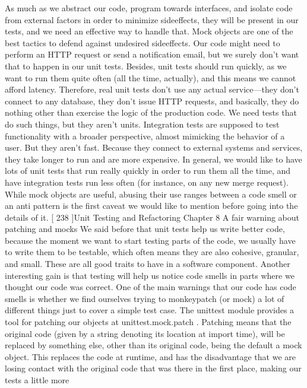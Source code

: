 \documentclass[a4paper,10pt,english]{sphinxmanual}
\begin{document}
As much as we abstract our code, program towards interfaces, and isolate code from
external factors in order to minimize side\sphinxhyphen{}effects, they will be present in our tests, and we
need an effective way to handle that.
Mock objects are one of the best tactics to defend against undesired side\sphinxhyphen{}effects. Our code
might need to perform an HTTP request or send a notification email, but we surely don’t
want that to happen in our unit tests. Besides, unit tests should run quickly, as we want to
run them quite often (all the time, actually), and this means we cannot afford latency.
Therefore, real unit tests don’t use any actual service—they don’t connect to any database,
they don’t issue HTTP requests, and basically, they do nothing other than exercise the logic
of the production code.
We need tests that do such things, but they aren’t units. Integration tests are supposed to
test functionality with a broader perspective, almost mimicking the behavior of a user. But
they aren’t fast. Because they connect to external systems and services, they take longer to
run and are more expensive. In general, we would like to have lots of unit tests that run
really quickly in order to run them all the time, and have integration tests run less often (for
instance, on any new merge request).
While mock objects are useful, abusing their use ranges between a code smell or an anti\sphinxhyphen{}
pattern is the first caveat we would like to mention before going into the details of it.
{[} 238 {]}Unit Testing and Refactoring
Chapter 8
A fair warning about patching and mocks
We said before that unit tests help us write better code, because the moment we want to
start testing parts of the code, we usually have to write them to be testable, which often
means they are also cohesive, granular, and small. These are all good traits to have in a
software component.
Another interesting gain is that testing will help us notice code smells in parts where we
thought our code was correct. One of the main warnings that our code has code smells is
whether we find ourselves trying to monkey\sphinxhyphen{}patch (or mock) a lot of different things just to
cover a simple test case.
The unittest module provides a tool for patching our objects at unittest.mock.patch .
Patching means that the original code (given by a string denoting its location at import
time), will be replaced by something else, other than its original code, being the default a
mock object. This replaces the code at run\sphinxhyphen{}time, and has the disadvantage that we are losing
contact with the original code that was there in the first place, making our tests a little more
\end{document}
